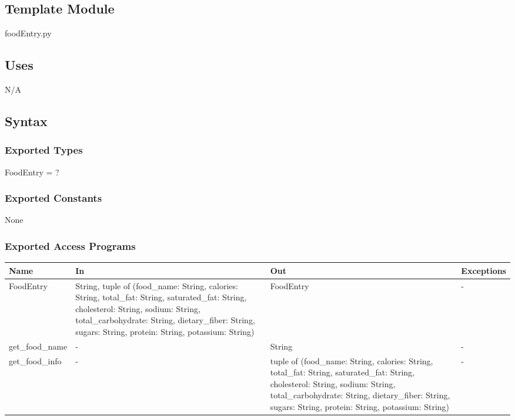 \documentclass[12pt, titlepage]{article}
\begin{document}
\subsection{Template Module}

foodEntry.py

\subsection{Uses}
N/A

\subsection{Syntax}

\subsubsection{Exported Types}
FoodEntry = ?

\subsubsection{Exported Constants}
None

\subsubsection{Exported Access Programs}

\begin{center}
	\begin{tabular}{p{3cm} p{5cm} p{5cm} p{2cm}}
		\hline
		\textbf{Name} & \textbf{In} & \textbf{Out} & \textbf{Exceptions} \\
		\hline
		FoodEntry & String, tuple of (food\_name: String, calories: String, total\_fat: String, saturated\_fat: String, cholesterol: String, sodium: String, total\_carbohydrate: String, dietary\_fiber: String, sugars: String, protein: String, potassium: String) & FoodEntry & - \\
		get\_food\_name & - & String & - \\
		get\_food\_info & - & tuple of (food\_name: String, calories: String, total\_fat: String, saturated\_fat: String, cholesterol: String, sodium: String, total\_carbohydrate: String, dietary\_fiber: String, sugars: String, protein: String, potassium: String) & - \\
		\hline
	\end{tabular}
\end{center}
\end{document}
